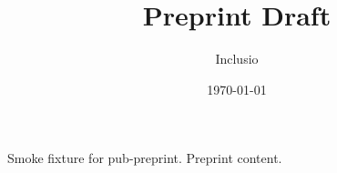 \documentclass[final,tagged]{pub-preprint}
\title{Preprint Draft}
\author{Inclusio}
\date{\today}
\begin{document}
\nolinenumbers
Smoke fixture for pub-preprint. Preprint content.
\end{document}
